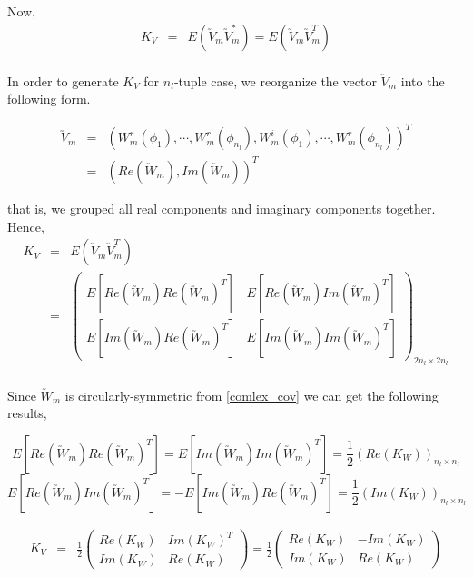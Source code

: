 	Now,
	\begin{eqnarray*}
		K_V & = & E(\utilde{V}_m\utilde{V}_m^*) = E(\utilde{V}_m\utilde{V}_m^T) \\
	\end{eqnarray*}
		
	In order to generate $K_V$ for $n_l$-tuple case, we reorganize the vector $\utilde{V}_m$ into the following form.
		
	\begin{eqnarray*}
		\utilde{V}_m  &=& (W_m^r(\phi_1),\cdots,W_m^r(\phi_{n_l}), W_m^i(\phi_1), \cdots, W_m^r(\phi_{n_l}))^T \\
		&=& (Re(\utilde{W}_m), Im(\utilde{W}_m))^T
	\end{eqnarray*}
		
	that is, we grouped all real components and imaginary components together. Hence,
	\begin{eqnarray*}
		K_V &=& E(\utilde{V}_m\utilde{V}_m^T) \\
		&=& \left(\begin{array}{ll}
		E[Re(\utilde{W}_m)Re(\utilde{W}_m)^T] &  E[Re(\utilde{W}_m)Im(\utilde{W}_m)^T] \\
		E[Im(\utilde{W}_m)Re(\utilde{W}_m)^T] &  E[Im(\utilde{W}_m)Im(\utilde{W}_m)^T]
		\end{array}
		\right)_{2n_{l}\times 2n_{l} } \\
	\end{eqnarray*}
		
	Since $\utilde{W}_m$ is circularly-symmetric from \ref{comlex_cov} we can get the following results,
		
	\[ E[Re(\utilde{W}_m)Re(\utilde{W}_m)^T] = E[Im(\utilde{W}_m)Im(\utilde{W}_m)^T] = \frac{1}{2}(Re(K_W))_{n_{l}\times n_{l}} \]
	\[ E[Re(\utilde{W}_m)Im(\utilde{W}_m)^T] = -E[Im(\utilde{W}_m)Re(\utilde{W}_m)^T] = \frac{1}{2}(Im(K_W))_{n_{l}\times n_{l}}\]
		
	\begin{eqnarray*}
		K_V&=& \frac{1}{2}\left( \begin{array}{ll}
		Re(K_W) & Im(K_W)^T \\
		Im(K_W) & Re(K_W)
		\end{array}
		\right) = \frac{1}{2}\left( \begin{array}{ll}
		Re(K_W) & -Im(K_W) \\
		Im(K_W) & Re(K_W)
		\end{array}
		\right)
	\end{eqnarray*}
		
